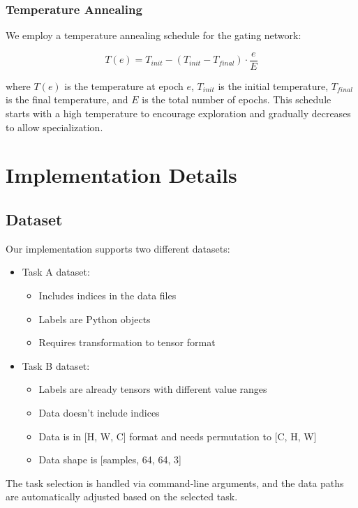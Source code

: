 \documentclass[conference]{IEEEtran}
\begin{document}
\subsubsection{Temperature Annealing}
We employ a temperature annealing schedule for the gating network:

\begin{equation}
T(e) = T_{init} - (T_{init} - T_{final}) \cdot \frac{e}{E}
\end{equation}

where $T(e)$ is the temperature at epoch $e$, $T_{init}$ is the initial temperature, $T_{final}$ is the final temperature, and $E$ is the total number of epochs. This schedule starts with a high temperature to encourage exploration and gradually decreases to allow specialization.

\section{Implementation Details}
\subsection{Dataset}
Our implementation supports two different datasets:

\begin{itemize}
    \item Task A dataset:
    \begin{itemize}
        \item Includes indices in the data files
        \item Labels are Python objects
        \item Requires transformation to tensor format
    \end{itemize}
    
    \item Task B dataset:
    \begin{itemize}
        \item Labels are already tensors with different value ranges
        \item Data doesn't include indices
        \item Data is in [H, W, C] format and needs permutation to [C, H, W]
        \item Data shape is [samples, 64, 64, 3]
    \end{itemize}
\end{itemize}

The task selection is handled via command-line arguments, and the data paths are automatically adjusted based on the selected task.
\end{document}
